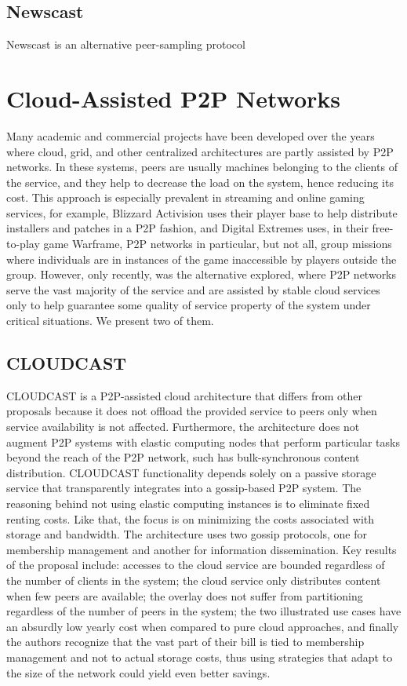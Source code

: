 \documentclass[runningheads]{llncs}
\begin{document}
\subsection{Newscast}
Newscast \cite{newscast} is an alternative peer-sampling protocol

\section{Cloud-Assisted P2P Networks}

Many academic and commercial projects have been developed over the years where cloud, grid, and other centralized architectures are partly assisted by P2P networks. In these systems, peers are usually machines belonging to the clients of the service, and they help to decrease the load on the system, hence reducing its cost. This approach is especially prevalent in streaming and online gaming services, for example, Blizzard Activision uses their player base to help distribute installers and patches in a P2P fashion, and Digital Extremes uses, in their free-to-play game Warframe, P2P networks in particular, but not all, group missions where individuals are in instances of the game inaccessible by players outside the group. However, only recently, was the alternative explored, where P2P networks serve the vast majority of the service and are assisted by stable cloud services only to help guarantee some quality of service property of the system under critical situations. We present two of them.

\subsection{CLOUDCAST}
CLOUDCAST \cite{cloudcast} is a P2P-assisted cloud architecture that differs from other proposals because it does not offload the provided service to peers only when service availability is not affected. Furthermore, the architecture does not augment P2P systems with elastic computing nodes that perform particular tasks beyond the reach of the P2P network, such has bulk-synchronous content distribution. CLOUDCAST functionality depends solely on a passive storage service that transparently integrates into a gossip-based P2P system. The reasoning behind not using elastic computing instances is to eliminate fixed renting costs. Like that, the focus is on minimizing the costs associated with storage and bandwidth. The architecture uses two gossip protocols, one for membership management and another for information dissemination. Key results of the proposal include: accesses to the cloud service are bounded regardless of the number of clients in the system; the cloud service only distributes content when few peers are available; the overlay does not suffer from partitioning regardless of the number of peers in the system; the two illustrated use cases have an absurdly low yearly cost when compared to pure cloud approaches, and finally the authors recognize that the vast part of their bill is tied to membership management and not to actual storage costs, thus using strategies that adapt to the size of the network could yield even better savings.
\end{document}
